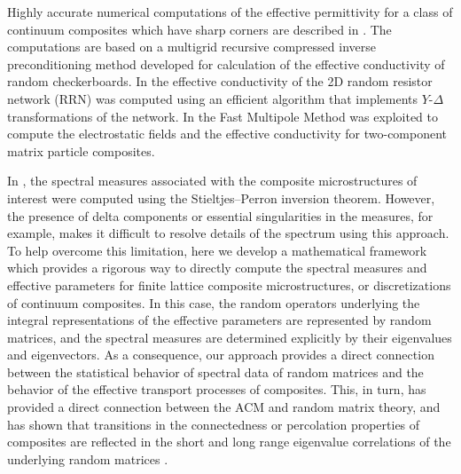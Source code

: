 \documentclass{cmslatex}
\begin{document}
Highly accurate numerical computations of the effective permittivity
for a class of continuum composites which have sharp corners are
described in \cite{Helsing:NJP:115005}. The computations are based on
a multigrid recursive compressed inverse preconditioning method
\cite{Helsing:2008:8820,Helsing:JCP:1171,Helsing:JCP:7533} developed 
for calculation of the effective conductivity of random
checkerboards. In \cite{Day:JPCM-96} the effective 
conductivity of the 2D random resistor network (RRN) 
was computed using an efficient algorithm that implements $Y$-$\Delta$
transformations of the network. In
\cite{Greengard:1994:379,Cheng:1997:629,Greengard:2006:64} the Fast
Multipole Method was exploited to compute the electrostatic fields and
the effective conductivity for two-component matrix particle
composites.      


In \cite{Helsing:NJP:115005,Day:JPCM-96}, the spectral measures
associated with the composite microstructures of interest were
computed using the Stieltjes--Perron inversion theorem. However, the
presence of delta components or essential singularities in the
measures, for example, makes it difficult to resolve details of the
spectrum using this approach. To help overcome this limitation, here
we develop a mathematical framework which provides a rigorous way to
directly compute the spectral measures and effective parameters for
finite lattice composite microstructures, or discretizations of
continuum composites. In this case, the random operators underlying the
integral representations of the effective parameters are represented
by random matrices, and the spectral measures are determined
explicitly by their eigenvalues and eigenvectors. As a consequence,
our approach provides a direct connection between the statistical
behavior of spectral data of random matrices and the behavior of the
effective transport processes of composites. This, in turn, has
provided a direct connection between the ACM and random matrix theory,
and has shown that transitions in the connectedness or percolation
properties of composites are reflected in the short and long range
eigenvalue correlations of the underlying random matrices
\cite{Murphy_RMT_of_Composites}. 

    
\end{document}
